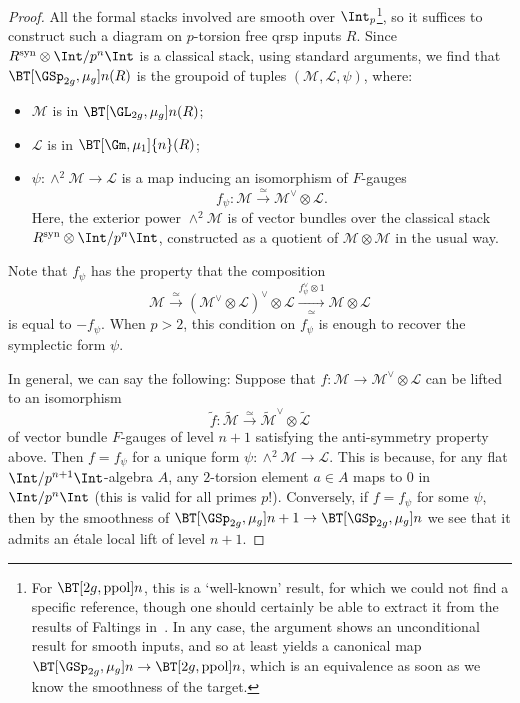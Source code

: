 \documentclass[10pt]{amsart}
\begin{document}
\begin{proof}
All the formal stacks involved are smooth over $\Int_p$\footnote{For $\BT[2g,\mathrm{ppol}]{n}$, this is a `well-known' result, for which we could not find a specific reference, though one should certainly be able to extract it from the results of Faltings in~\cite[\S 7]{Faltings2002-mp}. In any case, the argument shows an unconditional result for smooth inputs, and so at least yields a canonical map $\BT[\GSp_{2g},\mu_g]{n}\to \BT[2g,\mathrm{ppol}]{n}$, which is an equivalence as soon as we know the smoothness of the target.}, so it suffices to construct such a diagram on $p$-torsion free qrsp inputs $R$. Since $R^{\mathrm{syn}}\otimes\Int/p^n\Int$ is a classical stack, using standard arguments, we find that $\BT[\GSp_{2g},\mu_g]{n}(R)$ is the groupoid of tuples $(\mathcal{M},\mathcal{L},\psi)$, where:
\begin{itemize}
   \item $\mathcal{M}$ is in $\BT[\GL_{2g},\mu_g]{n}(R)$;
   \item $\mathcal{L}$ is in $\BT[\Gm,\mu_1]{n}(R)$;
   \item $\psi:\wedge^2 \mathcal{M}\to \mathcal{L}$ is a map inducing an isomorphism of $F$-gauges
   \[
    f_\psi:\mathcal{M}\xrightarrow{\simeq} \mathcal{M}^\vee\otimes \mathcal{L}.
   \]
   Here, the exterior power $\wedge^2 \mathcal{M}$ is of vector bundles over the classical stack $R^{\mathrm{syn}}\otimes\Int/p^n\Int$, constructed as a quotient of $\mathcal{M}\otimes \mathcal{M}$ in the usual way.
\end{itemize}
Note that $f_\psi$ has the property that the composition
\[
 \mathcal{M}\xrightarrow{\simeq}(\mathcal{M}^\vee\otimes \mathcal{L})^\vee\otimes \mathcal{L}\xrightarrow[\simeq]{f_\psi^\vee\otimes 1}\mathcal{M}\otimes \mathcal{L}
\]
is equal to $-f_\psi$. When $p>2$, this condition on $f_\psi$ is enough to recover the symplectic form $\psi$. 

In general, we can say the following: Suppose that $f:\mathcal{M}\to \mathcal{M}^\vee\otimes \mathcal{L}$ can be lifted to an isomorphism 
\[
\tilde{f}:\tilde{\mathcal{M}}\xrightarrow{\simeq}\tilde{\mathcal{M}}^\vee\otimes\tilde{\mathcal{L}} 
\]
of vector bundle $F$-gauges of level $n+1$ satisfying the anti-symmetry property above. Then $f = f_{\psi}$ for a unique form $\psi:\wedge^2\mathcal{M}\to \mathcal{L}$. This is because, for any flat $\Int/p^{n+1}\Int$-algebra $A$, any $2$-torsion element $a\in A$ maps to $0$ in $\Int/p^n\Int$ (this is valid for all primes $p$!). Conversely, if $f = f_\psi$ for some $\psi$, then by the smoothness of $\BT[\GSp_{2g},\mu_g]{n+1}\to \BT[\GSp_{2g},\mu_g]{n}$ we see that it admits an \'etale local lift of level $n+1$.



\end{proof}
\end{document}

